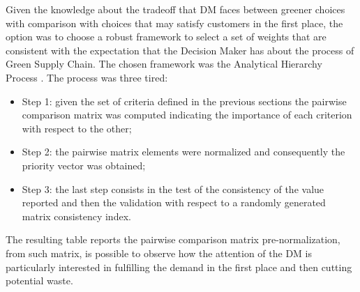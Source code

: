\begin{doublespace}
Given the knowledge about the tradeoff that DM faces between greener choices with comparison with choices that may satisfy customers in the first place, the option was to choose a robust framework to select a set of weights that are consistent with the expectation that the Decision Maker has about the process of Green Supply Chain. The chosen framework was the Analytical Hierarchy Process \cite{Saaty1980}. The process was three tired:
\begin{itemize}
    \item Step 1: given the set of criteria defined in the previous sections the pairwise comparison matrix was computed indicating the importance of each criterion with respect to the other;
    \item Step 2: the pairwise matrix elements were normalized and consequently the priority vector was obtained;
    \item Step 3: the last step consists in the test of the consistency of the value reported and then the validation with respect to a randomly generated matrix consistency index.
\end{itemize}
The resulting table reports the pairwise comparison matrix pre-normalization, from such matrix, is possible to observe how the attention of the DM is particularly interested in fulfilling the demand in the first place and then cutting potential waste.


\end{doublespace}
